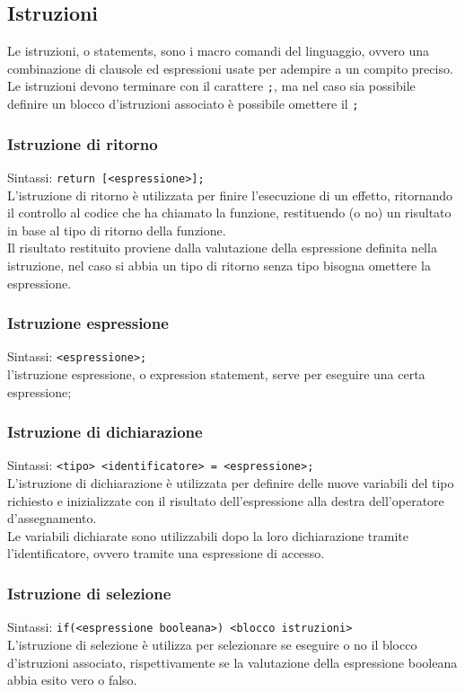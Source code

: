 \newpage
\subsection{Istruzioni}
Le istruzioni, o statements, sono i macro comandi del linguaggio, ovvero una combinazione 
di clausole ed espressioni usate per adempire a un compito preciso.
Le istruzioni devono terminare con il carattere \verb|;|, ma nel caso sia possibile definire
un blocco d'istruzioni associato è possibile omettere il \verb|;|

\subsubsection{Istruzione di ritorno}
Sintassi:   \verb|return [<espressione>];| \\
L’istruzione di ritorno è utilizzata per finire l’esecuzione di un effetto,
ritornando il controllo al codice che ha chiamato la funzione,
restituendo (o no) un risultato in base al tipo di ritorno della funzione. \\
Il risultato restituito proviene dalla valutazione della espressione definita nella istruzione,
nel caso si abbia un tipo di ritorno senza tipo bisogna omettere la espressione.

\subsubsection{Istruzione espressione}
Sintassi: \verb|<espressione>;| \\
l'istruzione espressione, o expression statement, serve per eseguire una certa espressione; 


\subsubsection{Istruzione di dichiarazione}
Sintassi: \verb|<tipo> <identificatore> = <espressione>;| \\
L'istruzione di dichiarazione è utilizzata per definire delle nuove variabili del tipo 
richiesto e inizializzate con il risultato dell'espressione alla destra dell'operatore d'assegnamento. \\
Le variabili dichiarate sono utilizzabili dopo la loro dichiarazione tramite l'identificatore, ovvero
tramite una espressione di accesso. 

\subsubsection{Istruzione di selezione}
Sintassi: \verb|if(<espressione booleana>) <blocco istruzioni>| \\
L'istruzione di selezione è utilizza per selezionare se eseguire o no il blocco d'istruzioni
associato, rispettivamente se la valutazione della espressione booleana abbia esito vero o falso.

